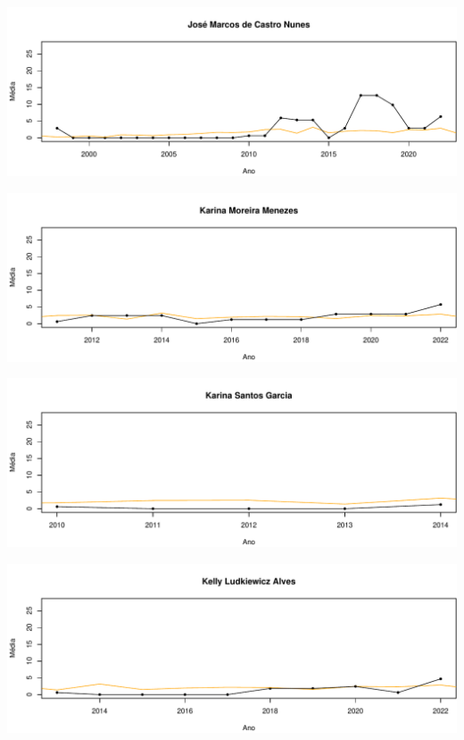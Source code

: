 \documentclass[12pt,brazil]{article}\usepackage[]{graphicx}\usepackage[]{xcolor}
\makeatletter
\def\maxwidth{ %
  \ifdim\Gin@nat@width>\linewidth
    \linewidth
  \else
    \Gin@nat@width
  \fi
}
\makeatother
\begin{document}
\vspace{0.5cm}


{\centering \includegraphics[width=\maxwidth]{figure/mediamovel-22} 

}



\vspace{0.5cm}


{\centering \includegraphics[width=\maxwidth]{figure/mediamovel-23} 

}



\vspace{0.5cm}


{\centering \includegraphics[width=\maxwidth]{figure/mediamovel-24} 

}



\vspace{0.5cm}


{\centering \includegraphics[width=\maxwidth]{figure/mediamovel-25} 

}
\end{document}
